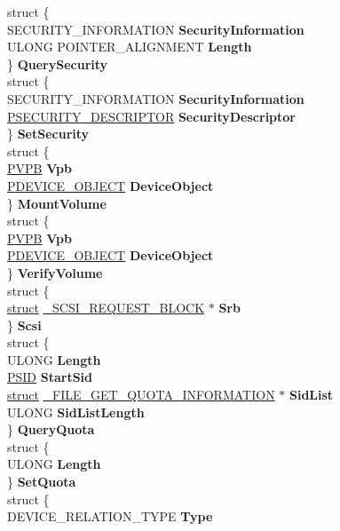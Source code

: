 \begin{DoxyCompactItemize}
\begin{tabbing}
\>struct \{\\
\>\>SECURITY\_INFORMATION {\bfseries SecurityInformation}\\
\>\>ULONG POINTER\_ALIGNMENT {\bfseries Length}\\
\>\} {\bfseries QuerySecurity}\\
\>struct \{\\
\>\>SECURITY\_INFORMATION {\bfseries SecurityInformation}\\
\>\>\hyperlink{struct___s_e_c_u_r_i_t_y___d_e_s_c_r_i_p_t_o_r}{PSECURITY\_DESCRIPTOR} {\bfseries SecurityDescriptor}\\
\>\} {\bfseries SetSecurity}\\
\>struct \{\\
\>\>\hyperlink{struct___v_p_b}{PVPB} {\bfseries Vpb}\\
\>\>\hyperlink{struct___d_e_v_i_c_e___o_b_j_e_c_t}{PDEVICE\_OBJECT} {\bfseries DeviceObject}\\
\>\} {\bfseries MountVolume}\\
\>struct \{\\
\>\>\hyperlink{struct___v_p_b}{PVPB} {\bfseries Vpb}\\
\>\>\hyperlink{struct___d_e_v_i_c_e___o_b_j_e_c_t}{PDEVICE\_OBJECT} {\bfseries DeviceObject}\\
\>\} {\bfseries VerifyVolume}\\
\>struct \{\\
\>\>\hyperlink{interfacestruct}{struct} \hyperlink{struct___s_c_s_i___r_e_q_u_e_s_t___b_l_o_c_k}{\_SCSI\_REQUEST\_BLOCK} $\ast$ {\bfseries Srb}\\
\>\} {\bfseries Scsi}\\
\>struct \{\\
\>\>ULONG {\bfseries Length}\\
\>\>\hyperlink{struct___s_i_d}{PSID} {\bfseries StartSid}\\
\>\>\hyperlink{interfacestruct}{struct} \hyperlink{struct___f_i_l_e___g_e_t___q_u_o_t_a___i_n_f_o_r_m_a_t_i_o_n}{\_FILE\_GET\_QUOTA\_INFORMATION} $\ast$ {\bfseries SidList}\\
\>\>ULONG {\bfseries SidListLength}\\
\>\} {\bfseries QueryQuota}\\
\>struct \{\\
\>\>ULONG {\bfseries Length}\\
\>\} {\bfseries SetQuota}\\
\>struct \{\\
\>\>DEVICE\_RELATION\_TYPE {\bfseries Type}\\

\end{tabbing}
\end{DoxyCompactItemize}
